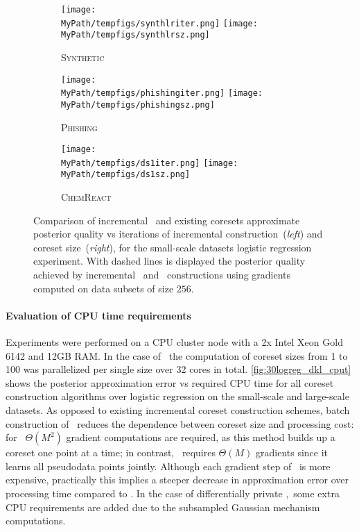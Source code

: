 \begin{figure*}[!t]
	\centering
	\begin{subfigure}[b]{\textwidth}
		\centering
		\caption*{\textsc{Synthetic}}
		\vspace*{-0.3cm}
		\texttt{[image: \\MyPath/tempfigs/synthlriter.png]} \hfill 
		\texttt{[image: \\MyPath/tempfigs/synthlrsz.png]}%
	\end{subfigure}\hfill\qquad
	\begin{subfigure}[b]{\textwidth}
		\centering
		\caption*{\textsc{Phishing}}
		\vspace*{-0.3cm}
		\texttt{[image: \\MyPath/tempfigs/phishingiter.png]} \hfill
		\texttt{[image: \\MyPath/tempfigs/phishingsz.png]}%
	\end{subfigure}\hfill\qquad
	\begin{subfigure}[b]{\textwidth}
				\centering
		\caption*{\textsc{ChemReact}}
		\vspace*{-0.3cm}
		\texttt{[image: \\MyPath/tempfigs/ds1iter.png]}
		\hfill
		\texttt{[image: \\MyPath/tempfigs/ds1sz.png]}%
	\end{subfigure}
	\caption{Comparison of incremental \psvi~and existing coresets approximate posterior
		quality vs iterations of incremental construction~(\emph{left}) and  coreset
		size~(\emph{right}), for the small-scale datasets logistic regression experiment. With dashed lines is displayed the posterior quality achieved
		by incremental \psvi~and \sparsevi~constructions using gradients computed on data subsets of size $256$.}
	\label{fig:logreg_dkl}
\end{figure*}



\paragraph{Evaluation of CPU time requirements} Experiments were performed on a CPU cluster node with a 2x Intel Xeon Gold 6142 and 12GB RAM. In the case of \psvi~the computation of coreset sizes from 1 to 100 was parallelized per single size over 32 cores in total. \cref{fig:30logreg_dkl_cput} shows the posterior approximation error vs required CPU time for all coreset construction algorithms over logistic regression on the small-scale and large-scale datasets. As opposed to existing incremental coreset construction schemes, batch construction of \psvi~reduces the dependence between coreset size and processing cost: for \sparsevi~$\Theta(M^2)$ gradient computations are required, as this method builds up a coreset one point at a time; in contrast, \psvi~requires $\Theta(M)$ gradients since it learns all pseudodata points jointly. Although each gradient step of \psvi~is more expensive, practically this implies a steeper decrease in approximation error over processing time compared to \sparsevi. In the case of differentially private \psvi,~some extra CPU requirements are added due to the subsampled Gaussian mechanism computations.


